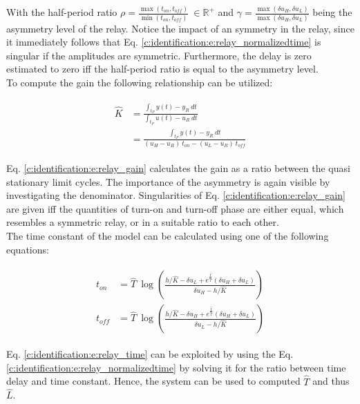 With the half-period ratio $\rho = \frac{\max\left(t_{on},t_{off} \right)}{\min\left(t_{on},t_{off} \right)} ~\in \mathbb{R}^+$ and $\gamma = \frac{\max\left(\delta u_H, \delta u_L \right)}{\max\left(\delta u_H, \delta u_L \right)}$ being the asymmetry level of the relay. Notice the impact of an symmetry in the relay, since it immediately follows that Eq. \ref{c:identification:e:relay_normalizedtime} is singular if the amplitudes are symmetric. Furthermore, the delay is zero estimated to zero iff the half-period ratio is equal to the asymmetry level.\\

To compute the gain the following relationship can be utilized:

\begin{align}
\begin{split}
\hat{K} &= \frac{\int_{t_P} y(t)-y_R~dt}{\int_{t_P} u(t)-u_R~dt} \\
&= \frac{\int_{t_P} y(t)-y_R~dt}{ \left( u_H -u_R \right)~t_{on} - \left( u_L - u_R \right)~t_{off}} 
\end{split}
\label{c:identification:e:relay_gain}
\end{align}

Eq. \ref{c:identification:e:relay_gain} calculates the gain as a ratio between the quasi stationary limit cycles. The importance of the asymmetry is again visible by investigating the denominator. Singularities of Eq. \ref{c:identification:e:relay_gain} are given iff the quantities of turn-on and turn-off phase are either equal, which resembles a symmetric relay, or in a suitable ratio to each other.\\

The time constant of the model can be calculated using one of the following equations:

\begin{align}
\begin{split}
t_{on} &= \hat{T}~ \log\left( \frac{h/\hat{K}-\delta u_L + e^\frac{\hat{L}}{\hat{T}} \left(\delta u_H + \delta u_L \right) }{\delta u_H - h/\hat{K}}\right) \\
t_{off} &= \hat{T}~  \log\left( \frac{h/\hat{K}-\delta u_H + e^\frac{\hat{L}}{\hat{T}} \left(\delta u_H + \delta u_L \right) }{\delta u_L - h/\hat{K}}\right) 
\end{split}
\label{c:identification:e:relay_time}
\end{align}

Eq. \ref{c:identification:e:relay_time} can be exploited by using the Eq. \ref{c:identification:e:relay_normalizedtime} by solving it for the ratio between time delay and time constant. Hence, the system can be used to computed $\hat{T}$ and thus $\hat{L}$. \\

